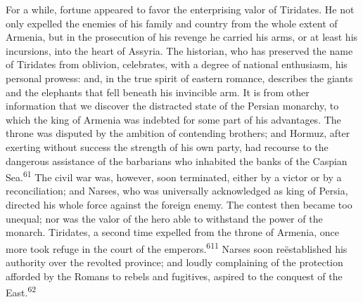 

For a while, fortune appeared to favor the enterprising valor of
Tiridates. He not only expelled the enemies of his family and
country from the whole extent of Armenia, but in the prosecution
of his revenge he carried his arms, or at least his incursions,
into the heart of Assyria. The historian, who has preserved the
name of Tiridates from oblivion, celebrates, with a degree of
national enthusiasm, his personal prowess: and, in the true
spirit of eastern romance, describes the giants and the elephants
that fell beneath his invincible arm. It is from other
information that we discover the distracted state of the Persian
monarchy, to which the king of Armenia was indebted for some part
of his advantages. The throne was disputed by the ambition of
contending brothers; and Hormuz, after exerting without success
the strength of his own party, had recourse to the dangerous
assistance of the barbarians who inhabited the banks of the
Caspian Sea.\textsuperscript{61} The civil war was, however, soon terminated,
either by a victor or by a reconciliation; and Narses, who was
universally acknowledged as king of Persia, directed his whole
force against the foreign enemy. The contest then became too
unequal; nor was the valor of the hero able to withstand the
power of the monarch. Tiridates, a second time expelled from the
throne of Armenia, once more took refuge in the court of the
emperors.\textsuperscript{611} Narses soon reëstablished his authority over the
revolted province; and loudly complaining of the protection
afforded by the Romans to rebels and fugitives, aspired to the
conquest of the East.\textsuperscript{62}

